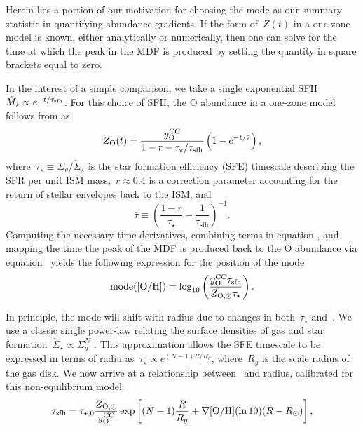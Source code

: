 Herein lies a portion of our motivation for choosing the mode as our summary
statistic in quantifying abundance gradients.
If the form of~$Z(t)$ in a one-zone model is known, either analytically or
numerically, then one can solve for the time at which the peak in the MDF is
produced by setting the quantity in square brackets equal to zero.
\par
In the interest of a simple comparison, we take a single exponential SFH
$\dot{M}_\star \propto e^{-t / \tau_\text{sfh}}$.
For this choice of SFH, the O abundance in a one-zone model follows from
\citet{Weinberg2017b} as 
\begin{equation}
Z_\text{O}(t) = \frac{y_\text{O}^\text{CC}}{1 - r - \tau_\star / \tau_\text{sfh}}
\left(1 - e^{-t / \bar{\tau}}\right),
\label{outflows:eq:zo-waf17}
\end{equation}
where~$\tau_\star \equiv \Sigma_g / \dot{\Sigma}_\star$ is the star formation
efficiency (SFE) timescale describing the SFR per unit ISM mass,~$r \approx 0.4$
is a correction parameter accounting for the return of stellar envelopes back
to the ISM, and
\begin{equation}
\bar{\tau} \equiv \left(
\frac{1 - r}{\tau_\star} - \frac{1}{\tau_\text{sfh}}
\right)^{-1}.
\label{outflows:eq:taubar-def}
\end{equation}
Computing the necessary time derivatives, combining terms in equation
, and mapping the time the peak of the MDF is
produced back to the O abundance via equation~
yields the following expression for the position of the mode
\begin{equation}
\text{mode([O/H])} = \log_{10} \left(
\frac{y_\text{O}^\text{CC} \tau_\text{sfh}}{Z_{\text{O},\odot} \tau_\star}
\right).
\end{equation}
\par
In principle, the mode will shift with radius due to changes in
both~$\tau_\star$ and~.
We use a classic single power-law relating the surface densities of gas and
star formation~$\dot{\Sigma}_\star \propto \Sigma_g^N$
\citep[e.g.,][]{Kennicutt1998}.
This approximation allows the SFE timescale to be expressed in terms of radiu
as~$\tau_\star \propto e^{(N - 1) R / R_g}$, where~$R_g$ is the scale radius of
the gas disk.
We now arrive at a relationship between~ and radius, calibrated
for this non-equilibrium model:
\begin{equation}
\tau_\text{sfh} = \tau_{\star,0} \frac{Z_{\text{O},\odot}}{y_\text{O}^\text{CC}}
\exp\left[(N - 1)\frac{R}{R_g} + \nabla\text{[O/H]} (\ln 10)(R - R_\odot)\right],
\label{outflows:eq:tausfh-radius}
\end{equation}
